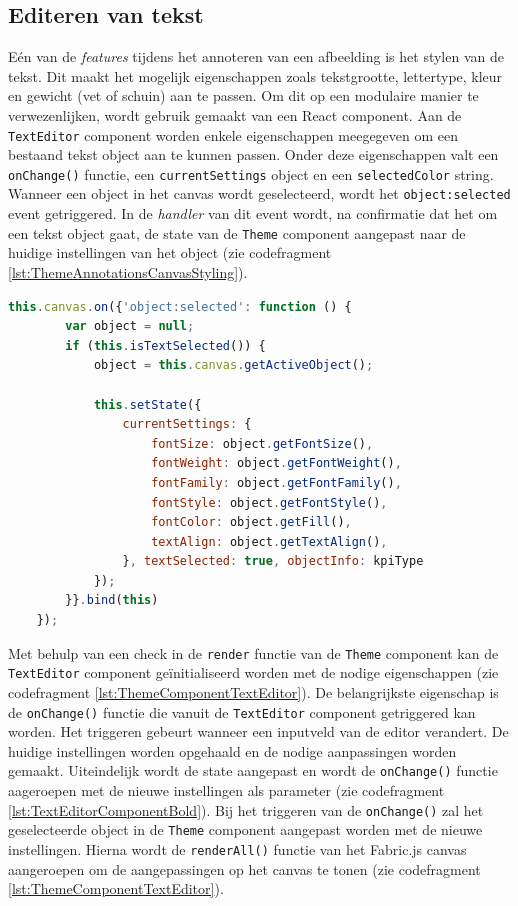 \subsection{Editeren van tekst}
E\'{e}n van de \textit{features} tijdens het annoteren van een afbeelding is het stylen van de tekst. Dit maakt het mogelijk eigenschappen zoals tekstgrootte, lettertype, kleur en gewicht (vet of schuin) aan te passen. Om dit op een modulaire manier te verwezenlijken, wordt gebruik gemaakt van een React component. Aan de \texttt{TextEditor} component worden enkele eigenschappen meegegeven om een bestaand tekst object aan te kunnen passen. Onder deze eigenschappen valt een \texttt{onChange()} functie, een \texttt{currentSettings} object en een \texttt{selectedColor} string. Wanneer een object in het canvas wordt geselecteerd, wordt het  \texttt{object:selected} event getriggered. In de \textit{handler} van dit event wordt, na confirmatie dat het om een tekst object gaat, de state van de \texttt{Theme} component aangepast naar de huidige instellingen van het object (zie codefragment \ref{lst:ThemeAnnotationsCanvasStyling}). 

\begin{lstlisting}[caption={ThemeAnnotations component - stylen van de tekst}, label={lst:ThemeAnnotationsCanvasStyling},language=javascript]
	this.canvas.on({'object:selected': function () {
		var object = null;
		if (this.isTextSelected()) {
			object = this.canvas.getActiveObject();
	
			this.setState({
				currentSettings: {
					fontSize: object.getFontSize(),
					fontWeight: object.getFontWeight(),
					fontFamily: object.getFontFamily(),
					fontStyle: object.getFontStyle(),
					fontColor: object.getFill(),
					textAlign: object.getTextAlign(),
				}, textSelected: true, objectInfo: kpiType
			});
		}}.bind(this)
	});
\end{lstlisting}

Met behulp van een check in de \texttt{render} functie van de \texttt{Theme} component kan de \texttt{TextEditor} component ge\"{i}nitialiseerd worden met de nodige eigenschappen (zie codefragment \ref{lst:ThemeComponentTextEditor}). De belangrijkste eigenschap is de \texttt{onChange()} functie die vanuit de \texttt{TextEditor} component getriggered kan worden. Het triggeren gebeurt wanneer een inputveld van de editor verandert. De huidige instellingen worden opgehaald en de nodige aanpassingen worden gemaakt. Uiteindelijk wordt de state aangepast en wordt de \texttt{onChange()} functie aageroepen met de nieuwe instellingen als parameter (zie codefragment \ref{lst:TextEditorComponentBold}). Bij het triggeren van de \texttt{onChange()} zal het geselecteerde object in de \texttt{Theme} component aangepast worden met de nieuwe instellingen. Hierna wordt de \texttt{renderAll()} functie van het Fabric.js canvas aangeroepen om de aangepassingen op het canvas te tonen (zie codefragment \ref{lst:ThemeComponentTextEditor}).

